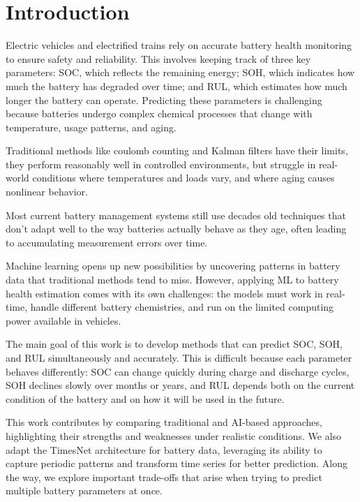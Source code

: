 
\chapter{Introduction}
\label{ch:introduction}

Electric vehicles and electrified trains rely on accurate battery health monitoring to ensure safety and reliability. This involves keeping track of three key parameters: SOC, which reflects the remaining energy; SOH, which indicates how much the battery has degraded over time; and RUL, which estimates how much longer the battery can operate. Predicting these parameters is challenging because batteries undergo complex chemical processes that change with temperature, usage patterns, and aging.

Traditional methods like coulomb counting and Kalman filters have their limits, they perform reasonably well in controlled environments, but struggle in real-world conditions where temperatures and loads vary, and where aging causes nonlinear behavior.

Most current battery management systems still use decades old techniques that don’t adapt well to the way batteries actually behave as they age, often leading to accumulating measurement errors over time.

Machine learning opens up new possibilities by uncovering patterns in battery data that traditional methods tend to miss. However, applying ML to battery health estimation comes with its own challenges: the models must work in real-time, handle different battery chemistries, and run on the limited computing power available in vehicles.

The main goal of this work is to develop methods that can predict SOC, SOH, and RUL simultaneously and accurately. This is difficult because each parameter behaves differently: SOC can change quickly during charge and discharge cycles, SOH declines slowly over months or years, and RUL depends both on the current condition of the battery and on how it will be used in the future.

This work contributes by comparing traditional and AI-based approaches, highlighting their strengths and weaknesses under realistic conditions. We also adapt the TimesNet architecture for battery data, leveraging its ability to capture periodic patterns and transform time series for better prediction. Along the way, we explore important trade-offs that arise when trying to predict multiple battery parameters at once.

